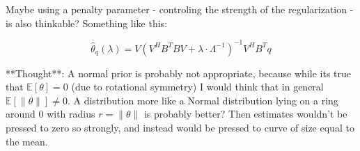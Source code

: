 Maybe using a penalty parameter - controling the strength of the regularization - is also thinkable? Something like this:

$$ \hat\theta_q(\lambda) = V ( V^H B^T B V + \lambda \cdot \Lambda^{-1})^{-1} V^H B^T q$$

**Thought**: A normal prior is probably not appropriate, because while its true that $\mathbb{E}[\theta] = 0$ (due to rotational symmetry) I would think that in general $\mathbb{E}[\lVert\theta\rVert] \neq 0$. A distribution more like a Normal distribution lying on a ring around 0 with radius $r = \lVert\theta\rVert$ is probably better? Then estimates wouldn't be pressed to zero so strongly, and instead would be pressed to curve of size equal to the mean.
